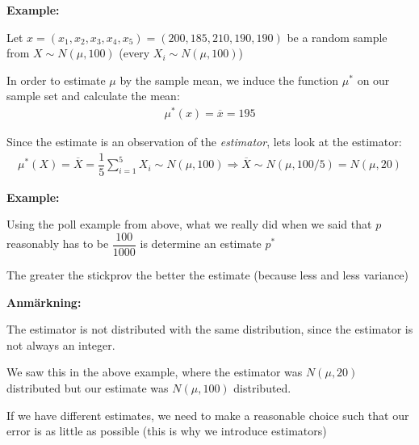 \noindent\textbf{Example:}\par
\noindent Let $x = (x_1,x_2,x_3,x_4,x_5) = (200,185,210,190,190)$ be a random sample from $X\sim N(\mu, 100)$ (every $X_i\sim N(\mu,100)$)
\par\bigskip
\noindent In order to estimate $\mu$ by the sample mean, we induce the function $\mu^*$ on our sample set and calculate the mean:
\begin{equation*}
  \begin{gathered}
    \mu^*(x) = \overline{x} = 195
  \end{gathered}
\end{equation*}\par
\noindent Since the estimate is an observation of the \textit{estimator}, lets look at the estimator:
\begin{equation*}
  \begin{gathered}
    \mu^*(X) = \overline{X} = \dfrac{1}{5}\sum_{i=1}^{5}X_i\sim N(\mu,100) \Rightarrow\overline{X}\sim N(\mu,100/5) = N(\mu, 20)
  \end{gathered}
\end{equation*}
\par\bigskip
\noindent\textbf{Example:}\par
\noindent Using the poll example from above, what we really did when we said that $p$ reasonably has to be $\dfrac{100}{1000}$ is determine an estimate $p^*$
\par\bigskip
\noindent The greater the stickprov the better the estimate (because less and less variance)
\par\bigskip
\noindent\textbf{Anmärkning:}\par
\noindent The estimator is not distributed with the same distribution, since the estimator is not always an integer.\par
\noindent We saw this in the above example, where the estimator was $N(\mu, 20)$ distributed but our estimate was $N(\mu,100)$  distributed. 
\par\bigskip
\noindent If we have different estimates, we need to make a reasonable choice such that our error is as little as possible (this is why we introduce estimators)
\par\bigskip
